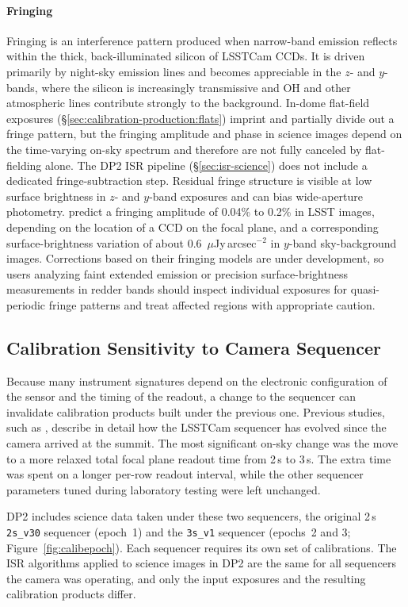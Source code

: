 \paragraph{Fringing}
Fringing is an interference pattern produced when narrow-band emission reflects within the thick, back-illuminated silicon of LSSTCam CCDs.
It is driven primarily by night-sky emission lines and becomes appreciable in the $z$- and $y$-bands, where the silicon is increasingly transmissive and OH and other atmospheric lines contribute strongly to the background.
In-dome flat-field exposures (\S\ref{sec:calibration-production:flats}) imprint and partially divide out a fringe pattern, but the fringing amplitude and phase in science images depend on the time-varying on-sky spectrum and therefore are not fully canceled by flat-fielding alone.
The DP2 ISR pipeline (\S\ref{sec:isr-science}) does not include a dedicated fringe-subtraction step.
Residual fringe structure is visible at low surface brightness in $z$- and $y$-band exposures and can bias wide-aperture photometry.
\citet{2023PASP..135c4503G} predict a fringing amplitude of 0.04\% to 0.2\% in LSST images, depending on the location of a CCD on the focal plane, and a corresponding surface-brightness variation of about 0.6~$\mu$Jy\,arcsec$^{-2}$ in $y$-band sky-background images.
Corrections based on their fringing models are under development, so users analyzing faint extended emission or precision surface-brightness measurements in redder bands should inspect individual exposures for quasi-periodic fringe patterns and treat affected regions with appropriate caution.

\subsection{Calibration Sensitivity to Camera Sequencer} \label{sec:discussion:sequencer}
Because many instrument signatures depend on the electronic configuration of the sensor and the timing of the readout, a change to the sequencer can invalidate calibration products built under the previous one.
Previous studies, such as \citet{2026arXiv260631806M}, describe in detail how the LSSTCam sequencer has evolved since the camera arrived at the summit.
The most significant on-sky change was the move to a more relaxed total focal plane readout time from 2\,s to 3\,s.
The extra time was spent on a longer per-row readout interval, while the other sequencer parameters tuned during laboratory testing were left unchanged.

DP2 includes science data taken under these two sequencers, the original 2\,s \texttt{2s\_v30} sequencer (epoch~1) and the \texttt{3s\_v1} sequencer (epochs~2 and 3; Figure~\ref{fig:calibepoch}).
Each sequencer requires its own set of calibrations.
The ISR algorithms applied to science images in DP2 are the same for all sequencers the camera was operating, and only the input exposures and the resulting calibration products differ.

